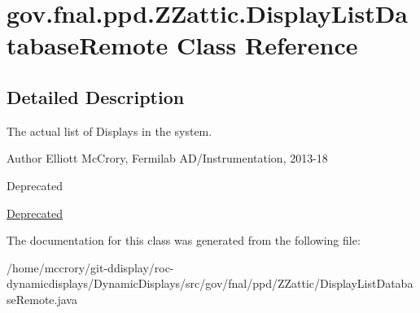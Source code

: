 \hypertarget{classgov_1_1fnal_1_1ppd_1_1ZZattic_1_1DisplayListDatabaseRemote}{\section{gov.\-fnal.\-ppd.\-Z\-Zattic.\-Display\-List\-Database\-Remote Class Reference}
\label{classgov_1_1fnal_1_1ppd_1_1ZZattic_1_1DisplayListDatabaseRemote}
}


\subsection{Detailed Description}
The actual list of Displays in the system.

\begin{DoxyAuthor}{Author}
Elliott Mc\-Crory, Fermilab A\-D/\-Instrumentation, 2013-\/18 
\end{DoxyAuthor}
\begin{DoxyRefDesc}{Deprecated}
\item[\hyperlink{deprecated__deprecated000008}{Deprecated}]\end{DoxyRefDesc}


The documentation for this class was generated from the following file\-:\begin{DoxyCompactItemize}
\item 
/home/mccrory/git-\/ddisplay/roc-\/dynamicdisplays/\-Dynamic\-Displays/src/gov/fnal/ppd/\-Z\-Zattic/Display\-List\-Database\-Remote.\-java\end{DoxyCompactItemize}
